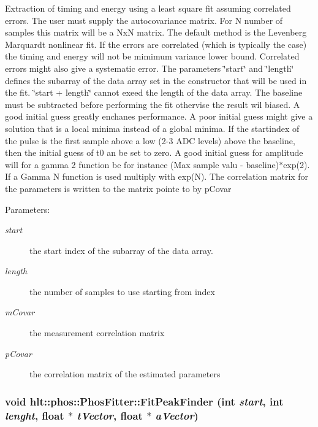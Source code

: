 Extraction of timing and energy using a least square fit assuming correlated errors. The user must supply the autocovariance matrix. For N number of samples this matrix will be a Nx\-N matrix. The default method is the Levenberg Marquardt nonlinear fit. If the errors are correlated (which is typically the case) the timing and energy will not be mimimum variance lower bound. Correlated errors might also give a systematic error. The parameters \char`\"{}start\char`\"{} and \char`\"{}length\char`\"{} defines the subarray of the data array set in the constructor that will be used in the fit. \char`\"{}start + length\char`\"{} cannot exeed the length of the data array. The baseline must be subtracted before performing the fit othervise the result wil biased. A good initial guess greatly enchanes performance. A poor initial guess might give a solution that is a local minima instead of a global minima. If the startindex of the pulse is the first sample above a low (2-3 ADC levels) above the baseline, then the initial guess of t0 an be set to zero. A good initial guess for amplitude will for a gamma 2 function be for instance (Max sample valu - baseline)$\ast$exp(2). If a Gamma N function is used multiply with exp(N). The correlation matrix for the parameters is written to the matrix pointe to by p\-Covar \begin{Desc}
\item[Parameters:]
\begin{description}
\item[{\em start}]the start index of the subarray of the data array. \item[{\em length}]the number of samples to use starting from index \item[{\em m\-Covar}]the measurement correlation matrix \item[{\em p\-Covar}]the correlation matrix of the estimated parameters \end{description}
\end{Desc}
\subsubsection{\setlength{\rightskip}{0pt plus 5cm}void hlt::phos::Phos\-Fitter::Fit\-Peak\-Finder (int {\em start}, int {\em lenght}, float $\ast$ {\em t\-Vector}, float $\ast$ {\em a\-Vector})}\label{classhlt_1_1phos_1_1PhosFitter_a5}


